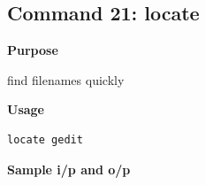 \subsection{Command 21: locate} 
\textbf{Purpose}
\begin{flushleft}
 find filenames quickly
\end{flushleft}
\textbf{Usage}
\begin{verbatim}
locate gedit
\end{verbatim}
\textbf{Sample i/p and o/p}
\begin{figure}[H] 
\end{figure}
